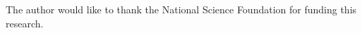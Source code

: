 \documentclass[a4paper,11pt]{article}
\begin{document}
\acknowledgments

The author would like to thank the National Science Foundation for funding this research.





%
%
%
%
%
%
%
%
\end{document}
